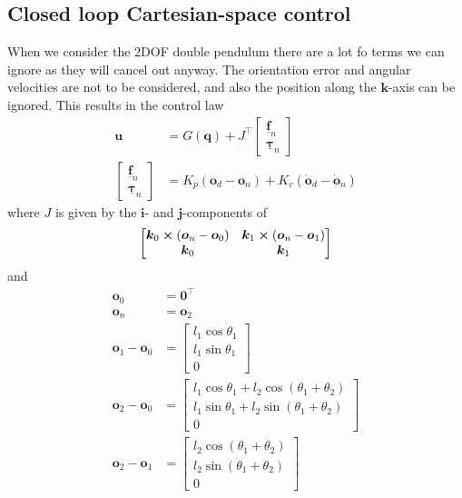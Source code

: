 \documentclass[a4paper]{scrartcl}
\begin{document}
\subsection{Closed loop Cartesian-space control}\label{ssec:stiffness}
When we consider the 2DOF double pendulum there are a lot fo terms we can ignore as they will cancel out anyway. The orientation error and angular velocities are not to be considered, and also the position along the $\bm{k}$-axis can be ignored. This results in the control law
\begin{equation}
	\begin{aligned}
		\bm{u} &= G(\bm{q}) + J^\top \begin{bmatrix} \underline{\bm{f}}_n \\ \underline{\bm{\tau}}_n \end{bmatrix}\\
		 \begin{bmatrix} \underline{\bm{f}}_n \\ \underline{\bm{\tau}}_n \end{bmatrix} &= K_p(\bm{o}_d - \bm{o}_n) + K_v(\dot{\bm{o}}_d - \dot{\bm{o}}_n) 
	\end{aligned}
\end{equation}
where $J$ is given by the $\bm{i}$- and $\bm{j}$-components of
\begin{equation}
	\begin{bmatrix}
		\bm{k}_0 \cross (\bm{o}_n - \bm{o}_0) & \bm{k}_1 \cross (\bm{o}_n - \bm{o}_1) \\
		\bm{k}_0 & \bm{k}_1
	\end{bmatrix}
\end{equation}
and
\begin{equation}
\begin{aligned}
	\bm{o}_0 &= \bm{0}^\top \\
	\bm{o}_n &= \bm{o}_2\\
	\bm{o}_1 - \bm{o}_0 &= \begin{bmatrix} l_1 \cos\theta_1 \\ l_1 \sin\theta_1 \\ 0 \end{bmatrix}\\
	\bm{o}_2 - \bm{o}_0 &= \begin{bmatrix} l_1 \cos\theta_1 + l_2 \cos(\theta_1 + \theta_2)\\
	l_1 \sin\theta_1 + l_2 \sin(\theta_1+\theta_2) \\ 0 \end{bmatrix}\\
	\bm{o}_2 - \bm{o}_1 &= \begin{bmatrix}l_2 \cos(\theta_1 + \theta_2) \\ l_2 \sin(\theta_1 + \theta_2) \\ 0\end{bmatrix}
\end{aligned}
\end{equation}
\end{document}
